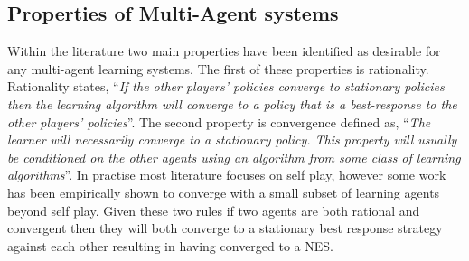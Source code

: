 \documentclass[conference]{IEEEtran}
\newcommand\katja[1]{{\color{dark-cyan}Katja: #1}}
\begin{document}
%

\subsection{Properties of Multi-Agent systems}

Within the literature two main properties have been identified as desirable for any multi-agent learning systems. The first of these properties is rationality. Rationality states, ``\textit{If the other players' policies converge to stationary policies then the learning algorithm will converge to a policy that is a best-response to the other players' policies}''\cite{bowling2002multiagent}. The second property is convergence defined as, ``\textit{The learner will necessarily converge to a stationary policy. This property will usually be conditioned on the other agents using an algorithm from some class of learning algorithms}''\cite{bowling2002multiagent}. In practise most literature focuses on self play, however some work has been empirically shown to converge with a small subset of learning agents beyond self play\cite{bowling2002multiagent}. Given these two rules if two agents are both rational and convergent then they will both converge to a stationary best response strategy against each other resulting in having converged to a NES.
\end{document}
